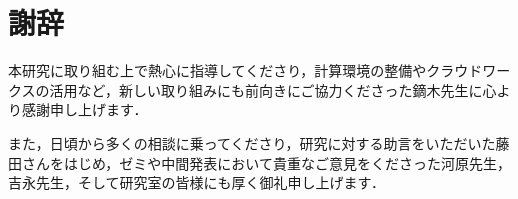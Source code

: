 \documentclass[12pt]{jarticle}
\numberwithin{equation}{section}    %
\numberwithin{figure}{section}      %
\numberwithin{table}{section}      %
\begin{document}
\clearpage

\section*{謝辞}
本研究に取り組む上で熱心に指導してくださり，計算環境の整備やクラウドワークスの活用など，新しい取り組みにも前向きにご協力くださった鏑木先生に心より感謝申し上げます．

また，日頃から多くの相談に乗ってくださり，研究に対する助言をいただいた藤田さんをはじめ，ゼミや中間発表において貴重なご意見をくださった河原先生，吉永先生，そして研究室の皆様にも厚く御礼申し上げます．

\clearpage



\end{document}
